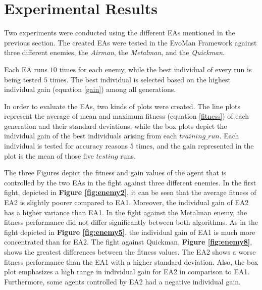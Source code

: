 \section{Experimental Results}
Two experiments were conducted using the different EAs mentioned in the previous section. The created EAs were tested in the EvoMan Framework \cite{defranca2020evoman} against three different enemies, the \emph{Airman}, the \emph{Metalman}, and the \emph{Quickman}.\par

Each EA runs $10\text{ times}$ for each enemy, while the best individual of every run is being tested $5\text{ times}$. The best individual is selected based on the highest individual gain (equation \ref{gain}) among all generations.\par

In order to evaluate the EAs, two kinds of plots were created. The line plots represent the average of mean and maximum fitness (equation \ref{fitness}) of each generation and their standard deviations, while the box plots depict the individual gain of the best individuals arising from each $training\_run$. Each individual is tested for accuracy reasons $5\text{ times}$, and the gain represented in the plot is the mean of those five $testing$ runs.\par

The three Figures depict the fitness and gain values of the agent that is controlled by the two EAs in the fight against three different enemies.
In the first fight, depicted in \textbf{Figure \ref{fig:enemy2}}, it can be seen that the average fitness of EA2 is slightly poorer compared to EA1. Moreover, the individual gain of EA2 has a higher variance than EA1. 
In the fight against the Metalman enemy, the fitness performance did not differ significantly between both algorithms. As in the fight depicted in \textbf{Figure \ref{fig:enemy5}}, the individual gain of EA1 is much more concentrated than for EA2. 
The fight against Quickman, \textbf{Figure \ref{fig:enemy8}}, shows the greatest differences between the fitness values. The EA2 shows a worse fitness performance than the EA1 with a higher standard deviation. Also, the box plot emphasizes a high range in individual gain for EA2 in comparison to EA1. Furthermore, some agents controlled by EA2 had a negative individual gain. \par
\intextsep

